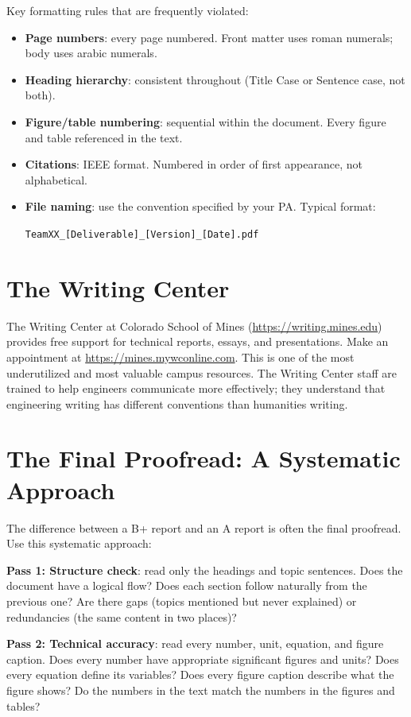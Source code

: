 Key formatting rules that are frequently violated:
\begin{itemize}[nosep,leftmargin=1.5em]
\item \textbf{Page numbers}: every page numbered. Front matter uses roman numerals; body uses arabic numerals.
\item \textbf{Heading hierarchy}: consistent throughout (Title Case or Sentence case, not both).
\item \textbf{Figure/table numbering}: sequential within the document. Every figure and table referenced in the text.
\item \textbf{Citations}: IEEE format. Numbered in order of first appearance, not alphabetical.
\item \textbf{File naming}: use the convention specified by your PA. Typical format:

\smallskip
\centerline{\texttt{TeamXX\_[Deliverable]\_[Version]\_[Date].pdf}}
\end{itemize}

\section{The Writing Center}
The Writing Center at Colorado School of Mines (\url{https://writing.mines.edu}) provides free support for technical reports, essays, and presentations. Make an appointment at \url{https://mines.mywconline.com}. This is one of the most underutilized and most valuable campus resources. The Writing Center staff are trained to help engineers communicate more effectively; they understand that engineering writing has different conventions than humanities writing.



\section{The Final Proofread: A Systematic Approach}
The difference between a B+ report and an A report is often the final proofread. Use this systematic approach:

\textbf{Pass 1: Structure check}: read only the headings and topic sentences. Does the document have a logical flow? Does each section follow naturally from the previous one? Are there gaps (topics mentioned but never explained) or redundancies (the same content in two places)?

\textbf{Pass 2: Technical accuracy}: read every number, unit, equation, and figure caption. Does every number have appropriate significant figures and units? Does every equation define its variables? Does every figure caption describe what the figure shows? Do the numbers in the text match the numbers in the figures and tables?

